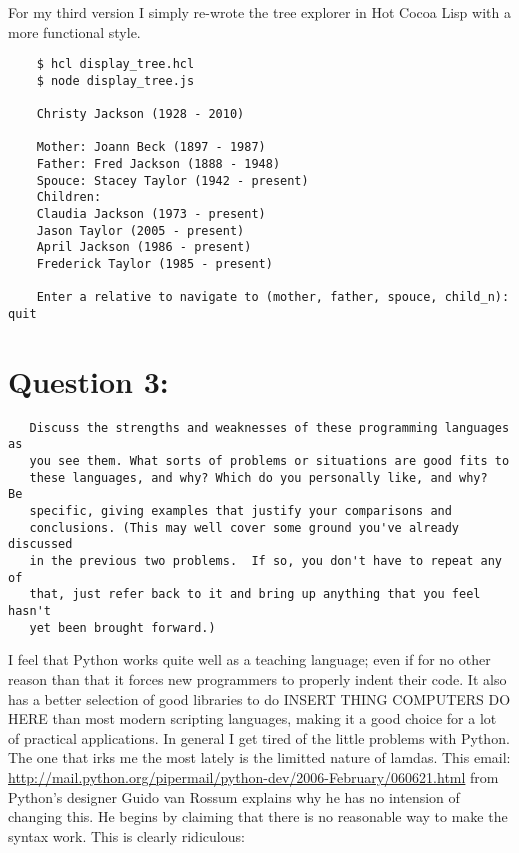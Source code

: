 \documentclass[11pt]{article}
\begin{document}
   
   For my third version I simply re-wrote the tree explorer in Hot
   Cocoa Lisp with a more functional style.
   
\begin{verbatim}
    $ hcl display_tree.hcl
    $ node display_tree.js
    
    Christy Jackson (1928 - 2010)
    
    Mother: Joann Beck (1897 - 1987)
    Father: Fred Jackson (1888 - 1948)
    Spouce: Stacey Taylor (1942 - present)
    Children:
    Claudia Jackson (1973 - present)
    Jason Taylor (2005 - present)
    April Jackson (1986 - present)
    Frederick Taylor (1985 - present)
    
    Enter a relative to navigate to (mother, father, spouce, child_n): quit
\end{verbatim}

   
\section*{Question 3:}
\label{sec-3}

  
\begin{verbatim}
   Discuss the strengths and weaknesses of these programming languages as
   you see them. What sorts of problems or situations are good fits to
   these languages, and why? Which do you personally like, and why?  Be
   specific, giving examples that justify your comparisons and
   conclusions. (This may well cover some ground you've already discussed
   in the previous two problems.  If so, you don't have to repeat any of
   that, just refer back to it and bring up anything that you feel hasn't
   yet been brought forward.)
\end{verbatim}

  
  I feel that Python works quite well as a teaching language; even if
  for no other reason than that it forces new programmers to properly
  indent their code.  It also has a better selection of good libraries
  to do INSERT THING COMPUTERS DO HERE than most modern scripting
  languages, making it a good choice for a lot of practical
  applications.  In general I get tired of the little problems with
  Python.  The one that irks me the most lately is the limitted nature
  of lamdas.  This email:
  \href{http://mail.python.org/pipermail/python-dev/2006-February/060621.html}{http://mail.python.org/pipermail/python-dev/2006-February/060621.html} 
  from Python's designer Guido van Rossum explains why he has no
  intension of changing this.  He begins by claiming that there is no
  reasonable way to make the syntax work.  This is clearly ridiculous:
  
\end{document}
